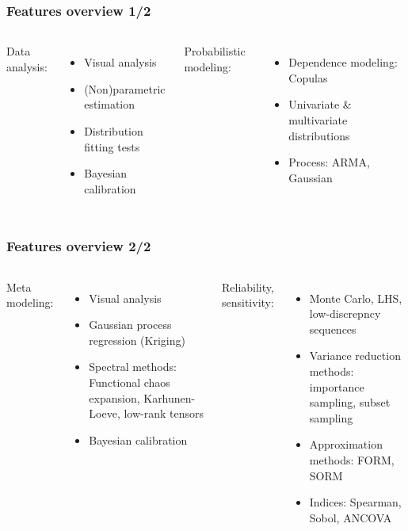 \documentclass{beamer}
\begin{document}
\begin{frame}[containsverbatim]
\frametitle{Features overview 1/2}

  \begin{columns}
Data analysis:
\begin{itemize}
\item Visual analysis
\item (Non)parametric estimation
\item Distribution fitting tests
\item Bayesian calibration
\end{itemize}


Probabilistic modeling:
\begin{itemize}
\item Dependence modeling: Copulas
\item Univariate \& multivariate distributions
\item Process: ARMA, Gaussian
\end{itemize}

\end{columns}

\end{frame}



\begin{frame}[containsverbatim]
\frametitle{Features overview 2/2}

  \begin{columns}
Meta modeling:
\begin{itemize}
\item Visual analysis
\item Gaussian process regression (Kriging)
\item Spectral methods: Functional chaos expansion, Karhunen-Loeve, low-rank tensors
\item Bayesian calibration
\end{itemize}


Reliability, sensitivity:
\begin{itemize}
\item Monte Carlo, LHS, low-discrepncy sequences
\item Variance reduction methods: importance sampling, subset sampling
\item Approximation methods: FORM, SORM
\item Indices: Spearman, Sobol, ANCOVA
\end{itemize}

\end{columns}

\end{frame}
\end{document}
